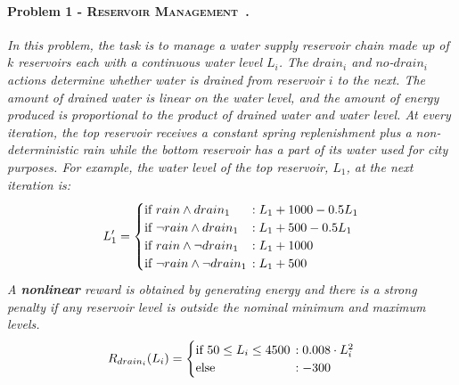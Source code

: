 \documentclass[letterpaper]{article}
\newcommand{\Reservoir}{\textsc{Reservoir Management}}
\begin{document}
\paragraph{\bf Problem 1 - \Reservoir~\cite{Yeh1985,Mahootchi2009}. \label{ex1}}
\textit{
In this problem, the task is to manage a water supply reservoir chain made up of $k$ reservoirs each with a continuous water level $L_i$.
The $drain_i$ and $no$-$drain_i$ actions determine whether water is drained from reservoir $i$ to the next.
The amount of drained water is linear on the water level, and the amount of energy produced is proportional to the product of drained water and water level.
At every iteration, the top reservoir receives a constant spring replenishment plus a non-deterministic rain while the bottom reservoir has a part of its water used for city purposes. For example, the water level of the top reservoir, $L_1$, at the next iteration is:
{\small
\hspace{-2mm}
\begin{align}
L_1' =
\begin{cases}
  \text{if }  rain \wedge drain_1 &\hspace{-2mm}: L_1 + 1000 - 0.5L_1\\ 
  \text{if }  \neg rain \wedge drain_1 &\hspace{-2mm}: L_1 + 500 - 0.5L_1\\ 
  \text{if }  rain \wedge \neg drain_1 &\hspace{-2mm}: L_1 + 1000\\ 
  \text{if }  \neg rain \wedge \neg drain_1 &\hspace{-2mm}: L_1 + 500\\ 
\end{cases}
\label{eq:l1}
\end{align}
}
A {\bf nonlinear} reward is obtained by generating energy and there is a strong penalty if any reservoir level is outside the nominal minimum and maximum levels.
{\small
\begin{align*}
R_{drain_i} (L_i)=
\begin{cases}
  \text{if }  50 \leq L_i \leq 4500 &\hspace{-2mm} : 0.008\cdot L_i^2\\ 
  \text{else}  &\hspace{-2mm} : -300\\ 
\end{cases}
\end{align*}
}
}
\end{document}
